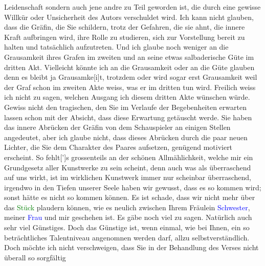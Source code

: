               Leidenschaft sondern auch jene andre zu Teil geworden ist, die durch eine gewisse
               Willkür oder Unsicherheit des Autors verschuldet wird. Ich kann nicht glauben, dass
               die Gräfin, die Sie schildern, trotz der Gefahren, die sie ahnt, die innere Kraft
               aufbringen wird, ihre Rolle zu studieren, sich zur Vorstellung bereit zu halten und
               tatsächlich aufzutreten. Und ich glaube noch weniger an die Grausamkeit ihres Grafen
               im zweiten und an seine etwas salbaderische Güte im dritten Akt. Vielleicht könnte ich
               an die Grausamkeit oder an {\pb}die Güte glauben  denn es bleibt ja Grausamke{[}i{]}t,
               trotzdem oder wird sogar erst Grausamkeit weil der Graf schon im zweiten Akte weiss,
               was er im dritten tun wird. Freilich weiss ich nicht zu sagen, welchen Ausgang ich
               diesem dritten Akte wünschen würde. Gewiss nicht den tragischen, den Sie im Verlaufe
               der Begebenheiten erwarten lassen schon mit der Absicht, dass diese Erwartung
               getäuscht werde. Sie haben das innere Abrücken der Gräfin von dem Schauspieler an
               einigen Stellen angedeutet, aber ich glaube nicht, dass dieses Abrücken durch die
               paar neuen Lichter, die Sie dem Charakter des Paares aufsetzen, genügend motiviert
               erscheint. So fehlt{[}’{]}s grossenteils an der schönen
               Allmählichkeit, welche mir ein Grundgesetz aller Kunstwerke zu sein scheint, denn
               auch was als überraschend auf uns wirkt, ist im wirklichen Kunstwerk immer nur
               scheinbar überraschend, irgendwo in den Tiefen unserer Seele haben wir gewusst, dass
               es so kommen wird; sonst hätte es nicht so kommen können.\pend
           \pstart
           {\pb}Es ist schade, dass wir nicht mehr über das \textcolor{green}{Stück}{} plaudern können, wie es
               neulich zwischen Ihrem Fräulein \textcolor{blue}{Schwester}{}, meiner \textcolor{blue}{Frau}{}
               und mir geschehen ist. Es gäbe noch viel zu sagen. Natürlich auch sehr viel
               Günstiges. Doch das Günstige ist, wenn einmal, wie bei Ihnen, ein so beträchtliches
               Talentniveau angenomnen werden darf, allzu selbstverständlich. Doch möchte ich nicht
               verschweigen, dass Sie in der Behandlung des Verses nicht überall so sorgfältig
